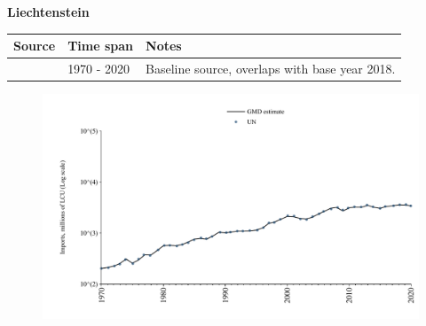 \documentclass[12pt,a4paper,landscape]{article}
\begin{document}
\begin{adjustbox}{max totalsize={\paperwidth}{\paperheight},center}
\begin{minipage}[t][\textheight][t]{\textwidth}
\vspace*{0.5cm}
{}
\begin{center}
{\Large\bfseries Liechtenstein}
\end{center}
\vspace{0.5cm}
\begin{table}[H]
\centering
\small
\begin{tabular}{|l|l|l|}
\hline
\textbf{Source} & \textbf{Time span} & \textbf{Notes} \\
\hline
\rowcolor{white}\cite{UN}& 1970 - 2020 &Baseline source, overlaps with base year 2018.\\
\hline
\end{tabular}
\end{table}
\begin{figure}[H]
\centering
\includegraphics[width=\textwidth,height=0.6\textheight,keepaspectratio]{graphs/LIE_imports.pdf}
\end{figure}
\end{minipage}
\end{adjustbox}
\end{document}
